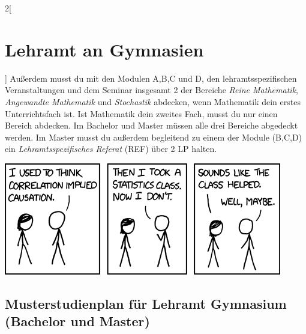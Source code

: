 \begin{multicols}{2}[\section{Lehramt an Gymnasien}]
Außerdem musst du mit den Modulen A,B,C und D, den lehramtsspezifischen
Veranstaltungen und dem Seminar insgesamt 2 der Bereiche \emph{Reine
Mathematik}, \emph{Angewandte Mathematik} und \emph{Stochastik} abdecken, wenn
Mathematik dein erstes Unterrichtsfach ist. Ist Mathematik dein zweites Fach,
musst du nur einen Bereich abdecken. Im Bachelor und Master müssen alle drei
Bereiche abgedeckt werden. Im Master musst du außerdem begleitend zu einem der
Module (B,C,D) ein \emph{Lehramtsspezifisches Referat} (REF) über 2 LP halten.

\begin{center}
\vfill\includegraphics[scale=.9]{comics/552}
\end{center}

\clearpage
\end{multicols}
\subsection{Musterstudienplan für Lehramt Gymnasium (Bachelor und Master)}

